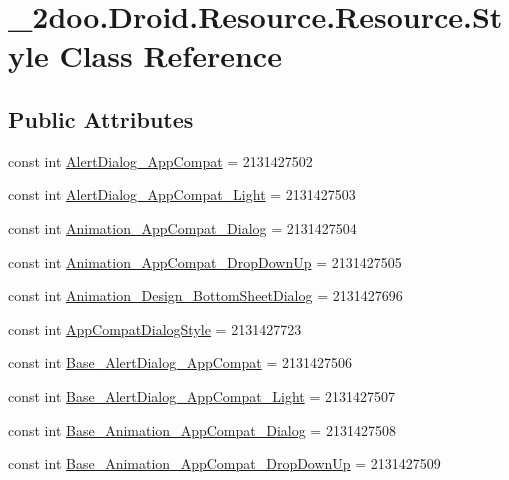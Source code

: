 \hypertarget{class__2doo_1_1_droid_1_1_resource_1_1_style}{
\section{\_\-2doo.Droid.Resource.Resource.Style Class Reference}
\label{class__2doo_1_1_droid_1_1_resource_1_1_style}
}
\subsection*{Public Attributes}
\begin{CompactItemize}
\item 
const int \hyperlink{class__2doo_1_1_droid_1_1_resource_1_1_style_7bc4e769e370fe3e5e79317e5a3d7b7b}{AlertDialog\_\-AppCompat} = 2131427502
\item 
const int \hyperlink{class__2doo_1_1_droid_1_1_resource_1_1_style_987bfa2a012910203ad8f4d8f86e1748}{AlertDialog\_\-AppCompat\_\-Light} = 2131427503
\item 
const int \hyperlink{class__2doo_1_1_droid_1_1_resource_1_1_style_2a40c711ea4abf02ed7ab6affdf51603}{Animation\_\-AppCompat\_\-Dialog} = 2131427504
\item 
const int \hyperlink{class__2doo_1_1_droid_1_1_resource_1_1_style_4358c9d6f710e44354cfbf09b88149b6}{Animation\_\-AppCompat\_\-DropDownUp} = 2131427505
\item 
const int \hyperlink{class__2doo_1_1_droid_1_1_resource_1_1_style_ed63da4b7f971de7b0b43326b11ddaa6}{Animation\_\-Design\_\-BottomSheetDialog} = 2131427696
\item 
const int \hyperlink{class__2doo_1_1_droid_1_1_resource_1_1_style_9c9faa83e26f7990fd3aa641f0d008a9}{AppCompatDialogStyle} = 2131427723
\item 
const int \hyperlink{class__2doo_1_1_droid_1_1_resource_1_1_style_aabb6e9b21f8141fa2d7fa1abd2570d3}{Base\_\-AlertDialog\_\-AppCompat} = 2131427506
\item 
const int \hyperlink{class__2doo_1_1_droid_1_1_resource_1_1_style_dff2346733586de9637763bb86c266c9}{Base\_\-AlertDialog\_\-AppCompat\_\-Light} = 2131427507
\item 
const int \hyperlink{class__2doo_1_1_droid_1_1_resource_1_1_style_0c5b28e1165efe7cee74119dd2a567d3}{Base\_\-Animation\_\-AppCompat\_\-Dialog} = 2131427508
\item 
const int \hyperlink{class__2doo_1_1_droid_1_1_resource_1_1_style_112055afcd606b421691db567e0c3947}{Base\_\-Animation\_\-AppCompat\_\-DropDownUp} = 2131427509

\end{CompactItemize}
